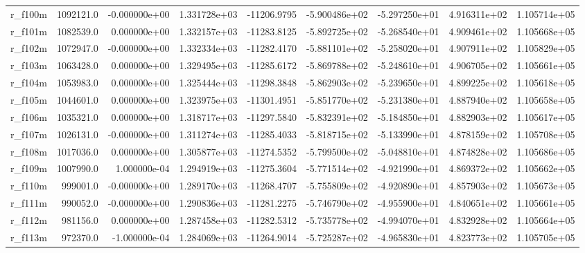 \documentclass[12pt]{article}
\begin{document}
\begin{landscape}
\begin{longtable}{|l|r|r|r|r|r|r|r|r|}
r\_f100m                 &  1092121.0 & -0.000000e+00 &  1.331728e+03 & -11206.9795 & -5.900486e+02 & -5.297250e+01 &  4.916311e+02 &  1.105714e+05 \\
r\_f101m                 &  1082539.0 &  0.000000e+00 &  1.332157e+03 & -11283.8125 & -5.892725e+02 & -5.268540e+01 &  4.909461e+02 &  1.105668e+05 \\
r\_f102m                 &  1072947.0 & -0.000000e+00 &  1.332334e+03 & -11282.4170 & -5.881101e+02 & -5.258020e+01 &  4.907911e+02 &  1.105829e+05 \\
r\_f103m                 &  1063428.0 &  0.000000e+00 &  1.329495e+03 & -11285.6172 & -5.869788e+02 & -5.248610e+01 &  4.906705e+02 &  1.105661e+05 \\
r\_f104m                 &  1053983.0 &  0.000000e+00 &  1.325444e+03 & -11298.3848 & -5.862903e+02 & -5.239650e+01 &  4.899225e+02 &  1.105618e+05 \\
r\_f105m                 &  1044601.0 &  0.000000e+00 &  1.323975e+03 & -11301.4951 & -5.851770e+02 & -5.231380e+01 &  4.887940e+02 &  1.105658e+05 \\
r\_f106m                 &  1035321.0 &  0.000000e+00 &  1.318717e+03 & -11297.5840 & -5.832391e+02 & -5.184850e+01 &  4.882903e+02 &  1.105617e+05 \\
r\_f107m                 &  1026131.0 & -0.000000e+00 &  1.311274e+03 & -11285.4033 & -5.818715e+02 & -5.133990e+01 &  4.878159e+02 &  1.105708e+05 \\
r\_f108m                 &  1017036.0 &  0.000000e+00 &  1.305877e+03 & -11274.5352 & -5.799500e+02 & -5.048810e+01 &  4.874828e+02 &  1.105686e+05 \\
r\_f109m                 &  1007990.0 &  1.000000e-04 &  1.294919e+03 & -11275.3604 & -5.771514e+02 & -4.921990e+01 &  4.869372e+02 &  1.105662e+05 \\
r\_f110m                 &   999001.0 & -0.000000e+00 &  1.289170e+03 & -11268.4707 & -5.755809e+02 & -4.920890e+01 &  4.857903e+02 &  1.105673e+05 \\
r\_f111m                 &   990052.0 & -0.000000e+00 &  1.290836e+03 & -11281.2275 & -5.746790e+02 & -4.955900e+01 &  4.840651e+02 &  1.105661e+05 \\
r\_f112m                 &   981156.0 &  0.000000e+00 &  1.287458e+03 & -11282.5312 & -5.735778e+02 & -4.994070e+01 &  4.832928e+02 &  1.105664e+05 \\
r\_f113m                 &   972370.0 & -1.000000e-04 &  1.284069e+03 & -11264.9014 & -5.725287e+02 & -4.965830e+01 &  4.823773e+02 &  1.105705e+05 \\

\end{longtable}
\end{landscape}
\end{document}
